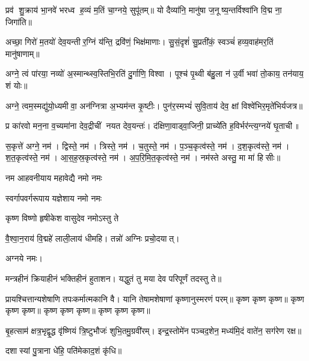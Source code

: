 प्रव॑ शु॒क्राय॑ भा॒नवे॑ भरध्व ह॒व्यं म॒तिं चा॒ग्नये॒ सुपू॑तम्॥ यो दैव्या॑नि॒ मानु॑षा ज॒नूष्य॒न्तर्विश्वा॑नि वि॒द्म ना॒ जिगा॑ति॥

अच्छा॒ गिरो॑ म॒तयो॑ देव॒यन्तीर॒ग्निं य॑न्ति॒ द्रवि॑णं॒ भिक्ष॑माणाः।
सु॒सं॒दृशं॑ सु॒प्रती॑कं॒ स्वञ्चं॑ हव्य॒वाह॑मर॒तिं मानु॑षाणाम्॥ 

अग्ने॒ त्वं पा॑रया॒ नव्यो॑ अ॒स्मान्थ्स्व॒स्तिभि॒रति॑ दु॒र्गाणि॒ विश्वा।
पूश्च॑ पृ॒थ्वी ब॑हु॒ला न॑ उ॒र्वी भवा॑ तो॒काय॒ तन॑याय॒ शं योः॥

अग्ने॒ त्वम॒स्मद्यु॑यो॒ध्यमीवा॒ अन॑ग्नित्रा अ॒भ्यम॑न्त कृ॒ष्टीः।
पुन॑र॒स्मभ्यं॑ सुवि॒ताय॑ देव॒ क्षां विश्वे॑भिर॒मृते॑भिर्यजत्र॥ 

प्र का॑रवो मन॒ना व॒च्यमा॑ना देव॒द्रीचीं नयत देव॒यन्तः॑।
द॑क्षिणा॒वाड्वा॒जिनी॒ प्राच्ये॑ति ह॒विर्भर॑न्त्य॒ग्नये॑ घृ॒ताची॥

स॒कृत्ते॑ अग्ने॒ नम॑। द्विस्ते॒ नम॑। त्रिस्ते॒ नम॑। च॒तुस्ते॒ नम॑। प॒ञ्च॒कृत्व॑स्ते॒ नम॑। द॒श॒कृत्व॑स्ते॒ नम॑। श॒त॒कृत्व॑स्ते॒ नम॑। आ॒स॒ह॒स्र॒कृत्व॑स्ते॒ नम॑। अ॒प॒रि॒मि॒त॒कृत्व॑स्ते॒ नम॑। नम॑स्ते अस्तु॒ मा मा॑ हिसीः॥

{नम आहवनीयाय महावेद्यै नमो नमः}

{स्वर्गापवर्गरूपाय यज्ञेशाय नमो नमः}

{कृष्ण विष्णो हृषीकेश वासुदेव नमोऽस्तु ते}

वै॒श्वा॒न॒राय॑ वि॒द्महे॑ लाली॒लाय॑ धीमहि। 
तन्नो॑ अग्निः प्रचो॒दयात्। 


अग्नये नमः।

मन्त्रहीनं क्रियाहीनं भक्तिहीनं हुताशन।
यद्धुतं तु मया देव परिपूर्णं तदस्तु ते॥

प्रायश्चित्तान्यशेषाणि तपःकर्मात्मकानि वै।
यानि तेषामशेषाणां कृष्णानुस्मरणं परम्॥
कृष्ण कृष्ण कृष्ण॥ कृष्ण कृष्ण कृष्ण॥ कृष्ण कृष्ण कृष्ण॥ कृष्ण कृष्ण कृष्ण॥

बृ॒हत्साम॑ क्षत्र॒भृद्वृ॒द्ध वृ॑ष्णियं त्रि॒ष्टुभौजः॑ शुभि॒तमु॒ग्रवी॑रम्।
इन्द्र॒स्तोमे॑न पञ्चद॒शेन॒ मध्य॑मि॒दं वाते॑न॒ सग॑रेण रक्ष॥

दशास्यां पु॒त्राना धे॑हि॒ पति॑मेकाद॒शं कृ॑धि॥